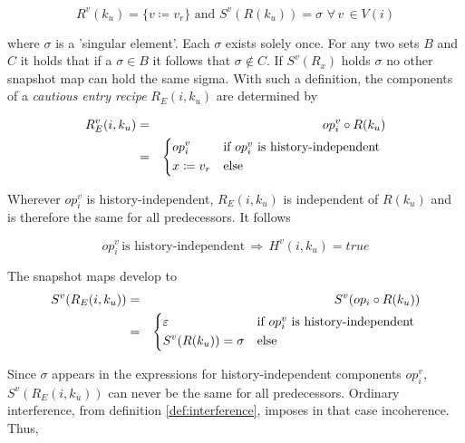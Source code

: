 \documentclass[12pt,a4paper]{scrartcl}
\begin{document}
\begin{equation} \label{eq:undetermined-recipe}
    R^v(k_u) = \{ v \coloneqq v_r \} \,\,\mbox{and}\,\, S^v(R(k_u)) = \sigma\,\,\forall\,v\,\in V(i)
\end{equation}

where $\sigma$ is a 'singular element'. Each $\sigma$ exists solely once. For
any two sets $B$ and $C$ it holds that if a $\sigma \in B$ it follows that
$\sigma \notin C$.  If $S^v(R_x)$ holds $\sigma$ no other snapshot map can hold
the same sigma.  With such a definition, the components of a \textit{cautious
entry recipe} $R_E(i,k_u)$ are determined by

\begin{eqnarray}
    R^v_E(i,k_u) & = & op^v_i \circ R(k_u) \\
                 & = & \begin{dcases*}
                       op^v_i         & if $op^v_i$ is history-independent \\
                       x \coloneq v_r & else
                       \end{dcases*}
\end{eqnarray}

Wherever $op^v_i$ is history-independent, $R_E(i,k_u)$ is independent of $R(k_u)$ and is
therefore the same for all predecessors. It follows

\begin{equation} \label{eq:cautious-recipe-coherence}
    op^v_i \,\mbox{is history-independent}\,\Rightarrow\,H^v(i, k_u) = true
\end{equation}

The snapshot maps develop to
\begin{eqnarray} \label{eq:cautious-repl-1}
    S^v(R_E(i,k_u)) & = & S^v(op_i \circ R(k_u)) \\ 
                    & = & \begin{dcases*}
                          \varepsilon          & if $op^v_i$ is history-independent \\
                          S^v(R(k_u)) = \sigma & else
                          \end{dcases*}
\end{eqnarray}

Since $\sigma$ appears in the expressions for history-independent components
$op^v_i$, $S^v(R_E(i,k_u))$ can never be the same for all predecessors.
Ordinary interference, from definition \ref{def:interference}, imposes in that
case incoherence. Thus,
\end{document}
